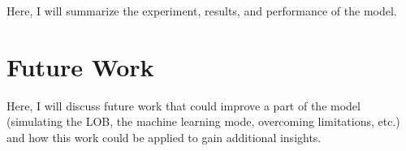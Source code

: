 Here, I will summarize the experiment, results, and performance of the model.
\section{Future Work}
Here, I will discuss future work that could improve a part of the model (simulating the LOB, the machine learning mode, overcoming limitations, etc.) and how this work could be applied to gain additional insights.